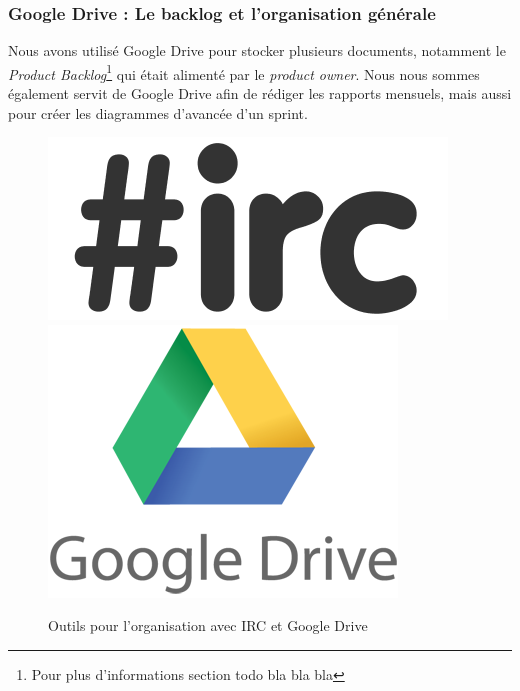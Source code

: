 \subsubsection{Google Drive : Le backlog et l'organisation générale}
Nous avons utilisé Google Drive pour stocker plusieurs documents, notamment le \textit{Product Backlog}\footnote{Pour plus d'informations
section todo bla bla bla} qui était alimenté par le \textit{product owner}.  Nous nous sommes également servit de Google Drive afin de rédiger les
rapports mensuels, mais aussi pour créer les diagrammes d'avancée d'un sprint. 

\begin{figure}[H]
	\centering
	\includegraphics[height=0.12\textwidth]{../beamer/logos/irc.png}~~
	\includegraphics[height=0.12\textwidth]{../beamer/logos/drive.png}
\caption{Outils pour l'organisation avec IRC et Google Drive}
\end{figure}


